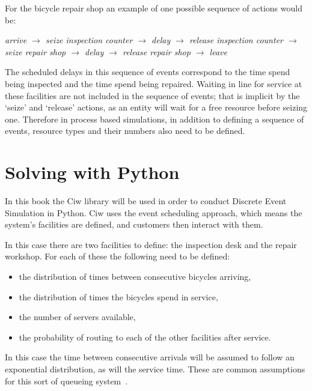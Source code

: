 For the bicycle repair shop an example of one possible sequence of actions would
be:

\textit{arrive
        \(\rightarrow\)
        seize inspection counter
        \(\rightarrow\)
        delay
        \(\rightarrow\)
        release inspection counter
        \(\rightarrow\)
        seize repair shop
        \(\rightarrow\)
        delay
        \(\rightarrow\)
        release repair shop
        \(\rightarrow\)
        leave
        }

The scheduled delays in this sequence of events correspond to the time spend
being inspected and the time spend being repaired. Waiting in line for service
at these facilities are not included in the sequence of events; that is implicit
by the `seize' and `release' actions, as an entity will wait for a free resource
before seizing one.
Therefore in process based simulations, in addition to defining a sequence of
events, resource types and their numbers also need to be defined.


\section{Solving with Python}\label{sec:solving-with-python}

In this book the Ciw library will be used in order to conduct Discrete Event
Simulation in Python.
Ciw uses the event scheduling approach, which means the system's
facilities are defined, and customers then interact with them.

In this case there are two facilities to define: the inspection desk and the
repair workshop. For each of these the following need to be defined:

\begin{itemize}
  \item the distribution of times between consecutive bicycles arriving,
  \item the distribution of times the bicycles spend in service,
  \item the number of servers available,
  \item the probability of routing to each of the other facilities after
  service.
\end{itemize}

In this case the time between consecutive arrivals will be assumed to follow an
exponential distribution, as will the service time.
These are common assumptions for this sort of queueing system~\autocite{stewart2009probability}.

